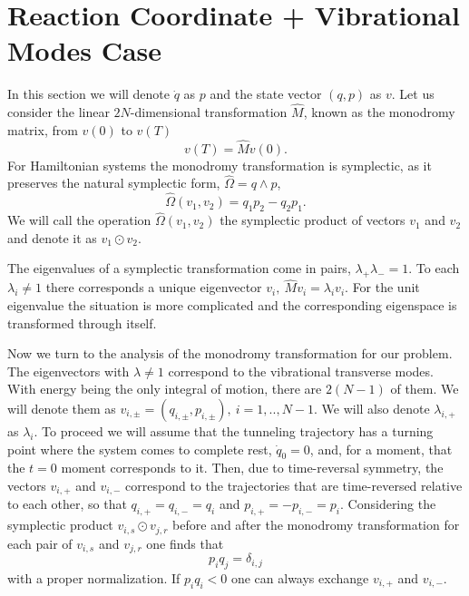 \documentclass[journal=jpcafh,manuscript=article]{achemso}
\begin{document}
\setcounter{equation}{0}
\section{Reaction Coordinate + Vibrational Modes Case}
In this section we will denote $\dot{q}$ as $p$ and the state vector
$(q, p)$ as $v$.  Let us consider the linear $2N$-dimensional
transformation $\hat{M}$, known as the monodromy matrix,\cite{gutzwiller71}
from $v(0)$ to $v(T)$
\begin{equation}
  \label{mon}
  v(T)=\hat{M}v(0).
\end{equation}
For Hamiltonian systems the monodromy transformation is symplectic, as
it preserves the natural symplectic form, $\hat{\Omega} = q\wedge p$,\cite{arnold78}
\begin{equation}
  \label{symp}
  \hat{\Omega}(v_1, v_2) = q_1p_2 - q_2p_1.
\end{equation}
We will call the operation $\hat{\Omega}(v_1, v_2)$ the symplectic product of
vectors $v_1$ and $v_2$ and denote it as $v_1\odot v_2$.

The eigenvalues of a symplectic transformation come in
pairs, $\lambda_+\lambda_-=1$. \cite{arnold78} To each
$\lambda_i \ne 1$ there corresponds a unique eigenvector
$v_i,\ \hat{M}v_i=\lambda_iv_i$. For the unit eigenvalue the situation is
more complicated and the corresponding eigenspace  is transformed
through itself.

Now we turn to the analysis of the monodromy transformation for our
problem. The eigenvectors with $\lambda \ne 1$ correspond to the
vibrational transverse modes. With energy being the only integral of
motion, there are $2(N - 1)$ of them.  We will denote them as
$v_{i,\pm}=(q_{i,\pm}, p_{i,\pm}),\ i=1,..,N-1$.  We will also denote
$\lambda_{i,+}$ as $\lambda_i$.  To proceed we will assume that the
tunneling trajectory has a turning point where the system comes to
complete rest, $\dot{q}_0=0$, and, for a moment, that the $t=0$ moment
corresponds to it. Then, due to time-reversal symmetry, the vectors
$v_{i,+}$ and $v_{i,-}$ correspond to the trajectories that are
time-reversed relative to each other, so that $q_{i,+} = q_{i,-}=q_i$
and $p_{i,+}=-p_{i,-}=p_i$. Considering the symplectic product
$v_{i,s}\odot v_{j,r}$ before and after the monodromy transformation
for each pair of $v_{i,s}$ and $v_{j,r}$ one finds that
\begin{equation}
  \label{ort_rel0}
  p_iq_j=\delta_{i,j}
\end{equation}
with a proper normalization. If $p_iq_i<0$ one can always exchange
$v_{i,+}$ and $v_{i,-}$.
\end{document}
